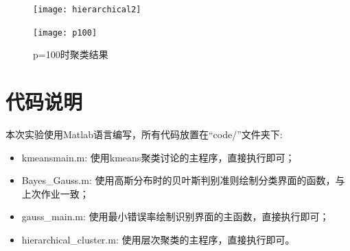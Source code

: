 \documentclass[cn]{elegantbook}
\begin{document}
\begin{figure}[!h]
	\centering
	\begin{minipage}{0.48\linewidth}
		\centering
		\texttt{[image: hierarchical2]}
	\end{minipage}
	\begin{minipage}{0.48\linewidth}
		\centering
		\texttt{[image: p100]}
	\end{minipage}
	\caption{\label{p6}p=100时聚类结果}
\end{figure}

\chapter{代码说明}
\noindent 本次实验使用Matlab语言编写，所有代码放置在“code/”文件夹下:
\begin{itemize}
	\item kmeansmain.m: 使用kmeans聚类讨论的主程序，直接执行即可；
	\item Bayes\_Gauss.m: 使用高斯分布时的贝叶斯判别准则绘制分类界面的函数，与上次作业一致；
	\item gauss\_main.m: 使用最小错误率绘制识别界面的主函数，直接执行即可；
	\item hierarchical\_cluster.m: 使用层次聚类的主程序，直接执行即可。
\end{itemize}
\end{document}
